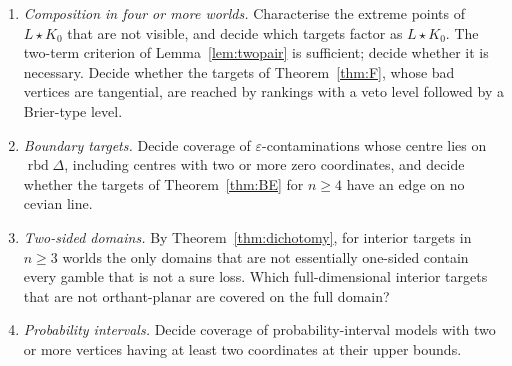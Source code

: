 \documentclass[11pt]{article}
\DeclareMathOperator{\conv}{conv}
\DeclareMathOperator{\rbd}{rbd}
\theoremstyle{plain}
\theoremstyle{definition}
\theoremstyle{remark}
\begin{document}
\begin{enumerate}[label=(\arabic*)]
  triangles with exactly two non-visible vertices joined by an edge on no cevian line,
  such as $\conv\{\frac18(1,6,1),\frac1{10}(6,1,3),\frac18(6,1,1)\}$, with one cevian edge,
  and $\conv\{\frac1{11}(6,4,1),\frac1{10}(6,1,3),\frac18(6,1,1)\}$, with two.
  \item \emph{Composition in four or more worlds.} Characterise the extreme points of
  $L\star K_0$ that are not visible, and decide which targets factor as $L\star K_0$. The
  two-term criterion of Lemma~\ref{lem:twopair} is sufficient; decide whether it is
  necessary. Decide
  whether the targets of Theorem~\ref{thm:F}, whose bad vertices are tangential, are
  reached by rankings with a veto level followed by a Brier-type level.
  \item \emph{Boundary targets.} Decide coverage of $\varepsilon$-contaminations whose centre
  lies on $\rbd\Delta$, including centres with two or more zero coordinates, and decide
  whether the targets of Theorem~\ref{thm:BE} for $n\ge4$ have an edge on no cevian line.
  \item \emph{Two-sided domains.} By Theorem~\ref{thm:dichotomy}, for interior targets in
  $n\ge3$ worlds the only domains that are not essentially one-sided contain every gamble
  that is not a sure loss. Which full-dimensional interior targets
  that are not orthant-planar are covered on the full domain?
  \item \emph{Probability intervals.} Decide coverage of probability-interval models with
  two or more vertices having at least two coordinates at their upper bounds.
\end{enumerate}
\end{document}
